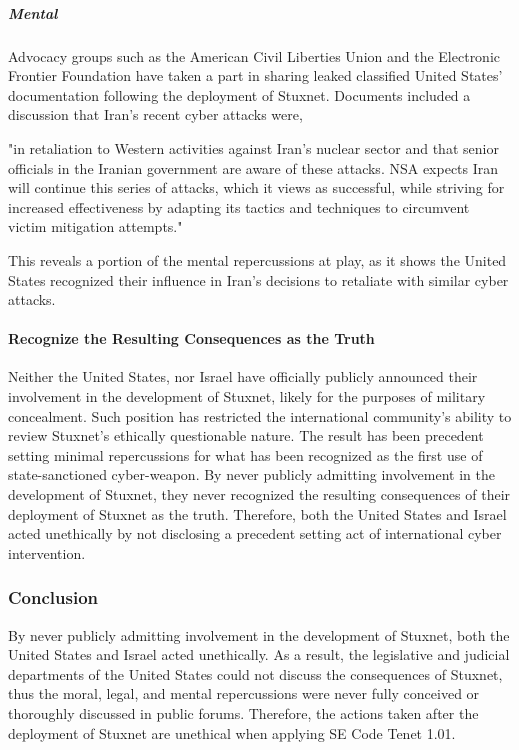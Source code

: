 \documentclass[12pt]{article}
\begin{document}
\begin{multicols}{2}
\subparagraph{Mental}

Advocacy groups such as the American Civil Liberties Union and the Electronic Frontier Foundation have taken a part in sharing leaked classified United States' documentation following the deployment of Stuxnet. Documents included a discussion that Iran's recent cyber attacks were, 

\begin{displayquote}
"in retaliation to Western activities against Iran's nuclear sector and that senior officials in the Iranian government are aware of these attacks. NSA expects Iran will continue this series of attacks, which it views as successful, while striving for increased effectiveness by adapting its tactics and techniques to circumvent victim mitigation attempts."\cite{effForwardsIranDiscussion}\cite{acluForwardsIranDiscussion}
\end{displayquote}

This reveals a portion of the mental repercussions at play, as it shows the United States recognized their influence in Iran's decisions to retaliate with similar cyber attacks.  

\paragraph{Recognize the Resulting Consequences as the Truth}

Neither the United States, nor Israel have officially publicly announced their involvement in the development of Stuxnet, likely for the purposes of military concealment. Such position has restricted the international community's ability to review Stuxnet's ethically questionable nature. The result has been precedent setting minimal repercussions for what has been recognized as the first use of state-sanctioned cyber-weapon. By never publicly admitting involvement in the development of Stuxnet, they never recognized the resulting consequences of their deployment of Stuxnet as the truth. Therefore, both the United States and Israel acted unethically by not disclosing a precedent setting act of international cyber intervention.

\subsubsection{Conclusion}

By never publicly admitting involvement in the development of Stuxnet, both the United States and Israel acted unethically. As a result, the legislative and judicial departments of the United States could not discuss the consequences of Stuxnet, thus the moral, legal, and mental repercussions were never fully conceived or thoroughly discussed in public forums. Therefore, the actions taken after the deployment of Stuxnet are unethical when applying SE Code Tenet 1.01.



\end{multicols}
\end{document}
